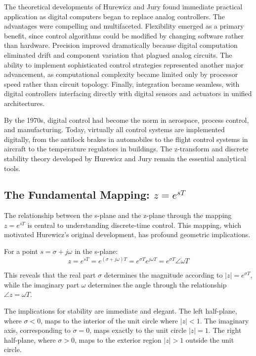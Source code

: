 The theoretical developments of Hurewicz and Jury found immediate practical application as digital computers began to replace analog controllers. The advantages were compelling and multifaceted. Flexibility emerged as a primary benefit, since control algorithms could be modified by changing software rather than hardware. Precision improved dramatically because digital computation eliminated drift and component variation that plagued analog circuits. The ability to implement sophisticated control strategies represented another major advancement, as computational complexity became limited only by processor speed rather than circuit topology. Finally, integration became seamless, with digital controllers interfacing directly with digital sensors and actuators in unified architectures.

By the 1970s, digital control had become the norm in aerospace, process control, and manufacturing. Today, virtually all control systems are implemented digitally, from the antilock brakes in automobiles to the flight control systems in aircraft to the temperature regulators in buildings. The z-transform and discrete stability theory developed by Hurewicz and Jury remain the essential analytical tools.

\subsection{The Fundamental Mapping: $z = e^{sT}$}

The relationship between the s-plane and the z-plane through the mapping $z = e^{sT}$ is central to understanding discrete-time control. This mapping, which motivated Hurewicz's original development, has profound geometric implications.

For a point $s = \sigma + j\omega$ in the s-plane:
\begin{equation}
z = e^{sT} = e^{(\sigma + j\omega)T} = e^{\sigma T} e^{j\omega T} = e^{\sigma T} \angle \omega T
\end{equation}

This reveals that the real part $\sigma$ determines the magnitude according to $|z| = e^{\sigma T}$, while the imaginary part $\omega$ determines the angle through the relationship $\angle z = \omega T$.

The implications for stability are immediate and elegant. The left half-plane, where $\sigma < 0$, maps to the interior of the unit circle where $|z| < 1$. The imaginary axis, corresponding to $\sigma = 0$, maps exactly to the unit circle $|z| = 1$. The right half-plane, where $\sigma > 0$, maps to the exterior region $|z| > 1$ outside the unit circle.

